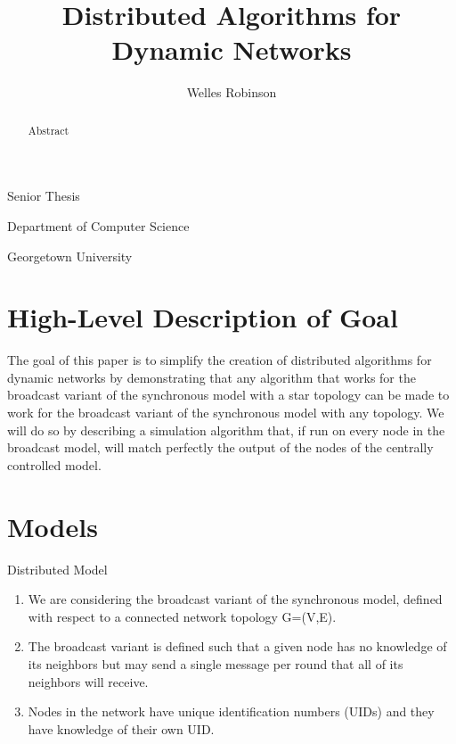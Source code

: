 \documentclass[english]{article}
\begin{document}
\title{Distributed Algorithms for Dynamic Networks}

\maketitle
\begin{center}\author{Welles Robinson}\end{center}
\noindent \begin{center}Senior Thesis\par\end{center}
\noindent \begin{center}Department of Computer
Science\par\end{center}
\noindent \begin{center}Georgetown University\par\end{center}

\newtheorem{definition} {Definition}
\newcommand{\mydef}[1]{\begin{definition}#1\end{definition}}

\begin{abstract}
Abstract
\end{abstract}

\section{High-Level Description of Goal}
The goal of this paper is to simplify the creation of distributed algorithms for dynamic networks by demonstrating that any algorithm that works for the broadcast variant of the synchronous model with a star topology can be made to work for the broadcast variant of the synchronous model with any topology. 
We will do so by describing a simulation algorithm that, if run on every node in the broadcast model, will match perfectly the output of the nodes of the centrally controlled model.

\section{Models}

Distributed Model
\begin{enumerate}
\item We are considering the broadcast variant of the synchronous model, defined with respect to a connected network topology G=(V,E).
\item The broadcast variant is defined such that a given node has no knowledge of its neighbors but may send a single message per round that all of its neighbors will receive.
\item Nodes in the network have unique identification numbers (UIDs) and they have knowledge of their own UID. 
\end{enumerate}
\end{document}
